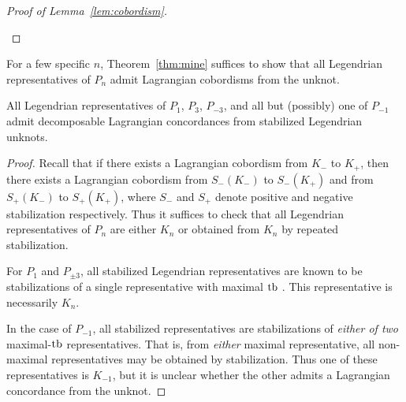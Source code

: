 \begin{proof}[Proof of Lemma~\ref{lem:cobordism}]
\begin{itemize}
\end{itemize}

\end{proof}

For a few specific $n$, Theorem~\ref{thm:mine} suffices to show that all Legendrian representatives of $P_n$ admit Lagrangian cobordisms from the unknot.
\begin{corollary}
    All Legendrian representatives of $P_1$, $P_3$, $P_{-3}$, and all but (possibly) one of $P_{-1}$ admit decomposable Lagrangian concordances from stabilized Legendrian unknots.
\end{corollary}
\begin{proof}

    Recall that if there exists a Lagrangian cobordism from $K_-$ to $K_+$, then there exists a Lagrangian cobordism from $S_-(K_-)$ to $S_-(K_+)$ and from $S_+(K_-)$ to $S_+(K_+)$, where $S_-$ and $S_+$ denote positive and negative stabilization respectively. Thus it suffices to check that all Legendrian representatives of $P_n$ are either $K_n$ or obtained from $K_n$ by repeated stabilization.

    For $P_{1}$ and $P_{\pm 3}$, all stabilized Legendrian representatives are known to be stabilizations of a single representative with maximal $\operatorname{tb}$ \cite{atlas}. This representative is necessarily $K_n$.

    In the case of $P_{-1}$, all stabilized representatives are stabilizations of \emph{either of two} maximal-$\operatorname{tb}$ representatives. That is, from \emph{either} maximal representative, all non-maximal representatives may be obtained by stabilization. Thus one of these representatives is $K_{-1}$, but it is unclear whether the other admits a Lagrangian concordance from the unknot.

\end{proof}
